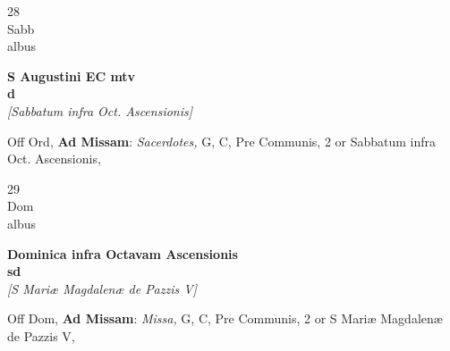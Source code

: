 \documentclass[10pt, openany]{book}
\begin{document}
        \begin{center}
            \begin{minipage}{3.5in}
                \vspace{2em}
                \begin{minipage}{0.5in}
                    {\Huge 28} \\
                    {\normalsize Sabb} \\
                    {\normalsize albus}
                \end{minipage}
                \begin{minipage}{3.0in}
                    \textbf{ \large S Augustini EC mtv \\
                    \textnormal{\normalsize d}} \\ \textit{[Sabbatum infra Oct. Ascensionis]} \\ 
                \end{minipage}
                \begin{justify}Off Ord, \textbf{Ad Missam}: \textit{Sacerdotes,} G, C, Pre Communis, 2 or Sabbatum infra Oct. Ascensionis,  
                \end{justify}
            \end{minipage}
        \end{center}
    
        \begin{center}
            \begin{minipage}{3.5in}
                \vspace{2em}
                \begin{minipage}{0.5in}
                    {\Huge 29} \\
                    {\normalsize Dom} \\
                    {\normalsize albus}
                \end{minipage}
                \begin{minipage}{3.0in}
                    \textbf{ \large Dominica infra Octavam Ascensionis \\
                    \textnormal{\normalsize sd}} \\ \textit{[S Mariæ Magdalenæ de Pazzis V]} \\ 
                \end{minipage}
                \begin{justify}Off Dom, \textbf{Ad Missam}: \textit{Missa,} G, C, Pre Communis, 2 or S Mariæ Magdalenæ de Pazzis V,  
                \end{justify}
            \end{minipage}
        \end{center}
    
\end{document}
